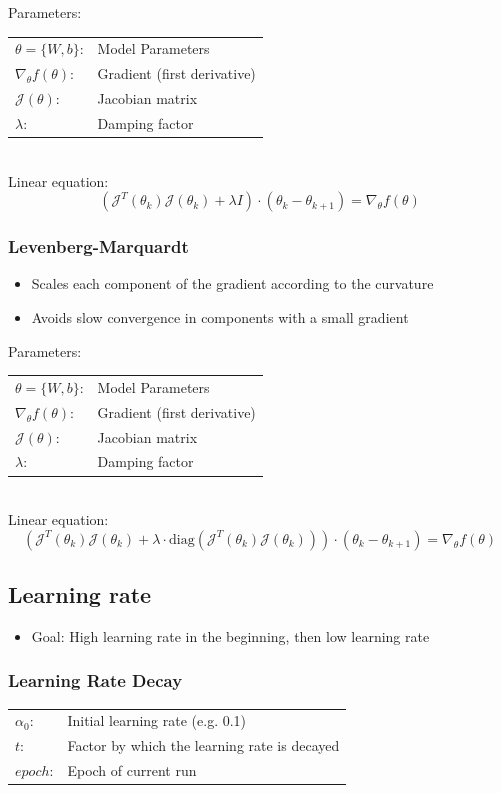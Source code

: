 \documentclass[10pt,a4paper]{article}
\newcommand{\pros}{\textcolor{green}{\textbf{+}}}
\newcommand{\ipros}{\item[\pros]}
\begin{document}
Parameters: \\
\begin{tabular}{ll}
	$\theta = \{W, b\}$: & Model Parameters \\
	$\nabla_\theta f(\theta)$: & Gradient (first derivative) \\
	$\mathcal J(\theta)$: & Jacobian matrix \\
	$\lambda$: & Damping factor
\end{tabular} \\

Linear equation:
$$
	(\mathcal J^T(\theta_k) \mathcal J(\theta_k) + \lambda I) ⋅ (\theta_k - \theta_{k + 1}) = \nabla_\theta f(\theta)
$$

\subsubsection{Levenberg-Marquardt}
\begin{itemize}
	\item Scales each component of the gradient according to the curvature
	\ipros Avoids slow convergence in components with a small gradient
\end{itemize}

Parameters: \\
\begin{tabular}{ll}
	$\theta = \{W, b\}$: & Model Parameters \\
	$\nabla_\theta f(\theta)$: & Gradient (first derivative) \\
	$\mathcal J(\theta)$: & Jacobian matrix \\
	$\lambda$: & Damping factor
\end{tabular} \\

Linear equation:
$$
	(\mathcal J^T(\theta_k) \mathcal J(\theta_k) + \lambda ⋅ \textrm{diag}(\mathcal J^T(\theta_k) \mathcal J(\theta_k))) ⋅ (\theta_k - \theta_{k + 1}) = \nabla_\theta f(\theta)
$$

\subsection{Learning rate}
\begin{itemize}
	\item Goal: High learning rate in the beginning, then low learning rate
\end{itemize}

\subsubsection{Learning Rate Decay}
\begin{tabular}{ll}
	$\alpha_0$: & Initial learning rate (e.g. 0.1) \\
	$t$: & Factor by which the learning rate is decayed \\
	$epoch$: & Epoch of current run
\end{tabular} \\
\end{document}
